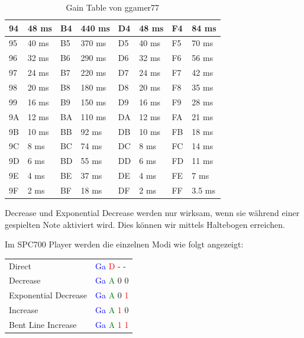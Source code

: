 \begin{table}[htbp]
\begin{tabularx}{\textwidth}{|l|X|l|X|l|X|l|X|}
	\hline
	94 & 48 ms & B4 & 440 ms & D4 & 48 ms & F4 & 84 ms \\
	\hline
	95 & 40 ms & B5 & 370 ms & D5 & 40 ms & F5 & 70 ms \\
	\hline
	96 & 32 ms & B6 & 290 ms & D6 & 32 ms & F6 & 56 ms \\
	\hline
	97 & 24 ms & B7 & 220 ms & D7 & 24 ms & F7 & 42 ms \\
	\hline
	98 & 20 ms & B8 & 180 ms & D8 & 20 ms & F8 & 35 ms \\
	\hline
	99 & 16 ms & B9 & 150 ms & D9 & 16 ms & F9 & 28 ms \\
	\hline
	9A & 12 ms & BA & 110 ms & DA & 12 ms & FA & 21 ms \\
	\hline
	9B & 10 ms & BB & 92 ms & DB & 10 ms & FB & 18 ms \\
	\hline
	9C & 8 ms & BC & 74 ms & DC & 8 ms & FC & 14 ms \\
	\hline
	9D & 6 ms & BD & 55 ms & DD & 6 ms & FD & 11 ms \\
	\hline
	9E & 4 ms & BE & 37 ms & DE & 4 ms & FE & 7 ms \\
	\hline
	9F & 2 ms & BF & 18 ms & DF & 2 ms & FF & 3.5 ms \\
	\hline
\end{tabularx}
\caption{Gain Table von ggamer77}
\end{table}

\medskip

Decrease und Exponential Decrease werden nur wirksam, wenn sie während einer gespielten Note aktiviert wird. Dies können wir mittels Haltebogen erreichen.

\bigskip

Im SPC700 Player werden die einzelnen Modi wie folgt angezeigt: 

\bigskip

\begin{tabularx}{\textwidth}{l l}
Direct & 
\textcolor{blue}{Ga}
\textcolor{red}{D}
- -
\\
Decrease & 
\textcolor{blue}{Ga}
\textcolor{green}{A}
0 0
\\
Exponential Decrease & 
\textcolor{blue}{Ga}
\textcolor{green}{A}
0
\textcolor{red}{1}
\\
Increase &
\textcolor{blue}{Ga}
\textcolor{green}{A}
\textcolor{red}{1}
0
\\
Bent Line Increase &
\textcolor{blue}{Ga}
\textcolor{green}{A}
\textcolor{red}{1}
\textcolor{red}{1}
\end{tabularx}

\bigskip


